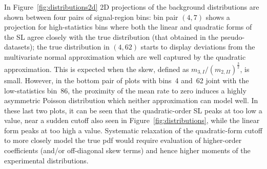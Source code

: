 \documentclass[11pt]{article}
\begin{document}
In Figure~\ref{fig:distributions2d} 2D projections of the background
distributions are shown between four pairs of signal-region bins: bin pair
$(4,7)$ shows a projection for high-statistics bins where both the linear and
quadratic forms of the SL agree closely with the true distribution (that obtained in the pseudo-datasets);
the true distribution in $(4,62)$ starts to display deviations from the multivariate
normal approximation which are well captured by the quadratic approximation. This is
expected when the skew, defined as $m_{3,I}/(m_{2,II})^{\frac{3}{2}}$, is small.
However, in the bottom pair of plots with bins~4 and~62 joint with the low-statistics
bin~86, the proximity of the mean rate to zero induces a highly asymmetric
Poisson distribution which neither approximation can model well. In these last
two plots, it can be seen that the quadratic-order SL peaks at too low a value,
near a sudden cutoff also seen in Figure~\ref{fig:distributions}, while the
linear form peaks at too high a value.  Systematic relaxation of the
quadratic-form cutoff to more closely model the true pdf would require
evaluation of higher-order coefficients (and/or off-diagonal skew terms) and
hence higher moments of the experimental distributions.
\end{document}
